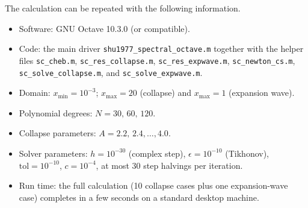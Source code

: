 \documentclass[11pt,a4paper]{article}
\begin{document}
The calculation can be repeated with the following information.

\begin{itemize}[nosep]
\item Software: GNU Octave 10.3.0 (or compatible).
\item Code: the main driver \texttt{shu1977\_spectral\_octave.m} together
      with the helper files \texttt{sc\_cheb.m},
      \texttt{sc\_res\_collapse.m}, \texttt{sc\_res\_expwave.m},
      \texttt{sc\_newton\_cs.m}, \texttt{sc\_solve\_collapse.m}, and
      \texttt{sc\_solve\_expwave.m}.
\item Domain: $x_{\min}=10^{-3}$; $x_{\max}=20$ (collapse) and
      $x_{\max}=1$ (expansion wave).
\item Polynomial degrees: $N=30,\,60,\,120$.
\item Collapse parameters: $A=2.2,\,2.4,\ldots,4.0$.
\item Solver parameters: $h=10^{-30}$ (complex step),
      $\epsilon=10^{-10}$ (Tikhonov), $\mathrm{tol}=10^{-10}$,
      $c=10^{-4}$, at most 30 step halvings per iteration.
\item Run time: the full calculation (10 collapse cases plus one
      expansion-wave case) completes in a few seconds on a standard
      desktop machine.
\end{itemize}
\end{document}
